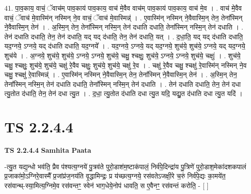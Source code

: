 \documentclass[17pt]{extarticle}
\begin{document}
41. पा॒व॒काय॒ वाचं॒ ॅवाच॑म् पाव॒काय॑ पाव॒काय॒ वाच॑ मे॒वैव वाच॑म् पाव॒काय॑ पाव॒काय॒ वाच॑ मे॒व । . वाच॑ मे॒वैव वाचं॒ ॅवाच॑ मे॒वास्मि॑न् नस्मिन् ने॒व वाचं॒ ॅवाच॑ मे॒वास्मिन्न्॑ । . ए॒वास्मि॑न् नस्मिन् ने॒वैवास्मि॒न् तेन॒ तेना᳚स्मिन् ने॒वैवास्मि॒न् तेन॑ । . अ॒स्मि॒न् तेन॒ तेना᳚स्मिन् नस्मि॒न् तेन॑ दधाति दधाति॒ तेना᳚स्मिन् नस्मि॒न् तेन॑ दधाति । . तेन॑ दधाति दधाति॒ तेन॒ तेन॑ दधाति॒ यद् यद् द॑धाति॒ तेन॒ तेन॑ दधाति॒ यत् । . द॒धा॒ति॒ यद् यद् द॑धाति दधाति॒ यद॒ग्नये॒ ऽग्नये॒ यद् द॑धाति दधाति॒ यद॒ग्नये᳚ । . यद॒ग्नये॒ ऽग्नये॒ यद् यद॒ग्नये॒ शुच॑ये॒ शुच॑ये॒ ऽग्नये॒ यद् यद॒ग्नये॒ शुच॑ये । . अ॒ग्नये॒ शुच॑ये॒ शुच॑ये॒ ऽग्नये॒ ऽग्नये॒ शुच॑ये॒ चक्षु॒ श्चक्षुः॒ शुच॑ये॒ ऽग्नये॒ ऽग्नये॒ शुच॑ये॒ चक्षुः॑ । . शुच॑ये॒ चक्षु॒ श्चक्षुः॒ शुच॑ये॒ शुच॑ये॒ चक्षु॑ रे॒वैव चक्षुः॒ शुच॑ये॒ शुच॑ये॒ चक्षु॑ रे॒व । . चक्षु॑ रे॒वैव चक्षु॒ श्चक्षु॑ रे॒वास्मि॑न् नस्मिन् ने॒व चक्षु॒ श्चक्षु॑ रे॒वास्मिन्न्॑ । . ए॒वास्मि॑न् नस्मिन् ने॒वैवास्मि॒न् तेन॒ तेना᳚स्मिन् ने॒वैवास्मि॒न् तेन॑ । . अ॒स्मि॒न् तेन॒ तेना᳚स्मिन् नस्मि॒न् तेन॑ दधाति दधाति॒ तेना᳚स्मिन् नस्मि॒न् तेन॑ दधाति । . तेन॑ दधाति दधाति॒ तेन॒ तेन॑ दधा त्यु॒तोत द॑धाति॒ तेन॒ तेन॑ दधा त्यु॒त । . द॒धा॒ त्यु॒तोत द॑धाति दधा त्यु॒त यदि॒ यद्यु॒त द॑धाति दधा त्यु॒त यदि॑ । \newline
\pagebreak
{}

\section{ TS 2.2.4.4 }

\textbf{TS 2.2.4.4 } \newline
\textbf{Samhita Paata} \newline

-त्यु॒त यद्य॒न्धो भव॑ति॒ प्रैव प॑श्यत्य॒ग्नये॑ पु॒त्रव॑ते पुरो॒डाश॑म॒ष्टाक॑पालं॒ निर्व॑पे॒दिन्द्रा॑य पु॒त्रिणे॑ पुरो॒डाश॒मेका॑दशकपालं प्र॒जाका॑मो॒ऽग्निरे॒वास्मै᳚ प्र॒जांप्र॑ज॒नय॑ति वृ॒द्धामिन्द्रः॒ प्र य॑च्छत्य॒ग्नये॒ रस॑वतेऽजक्षी॒रे च॒रुं निर्व॑पे॒द्यः का॒मये॑त॒ रस॑वान्थ्-स्या॒मित्य॒ग्निमे॒व रस॑वन्तꣳ॒॒ स्वेन॑ भाग॒धेये॒नोप॑ धावति॒ स ए॒वैनꣳ॒॒ रस॑वन्तं करोति॒ - [  ] \newline
\end{document}
